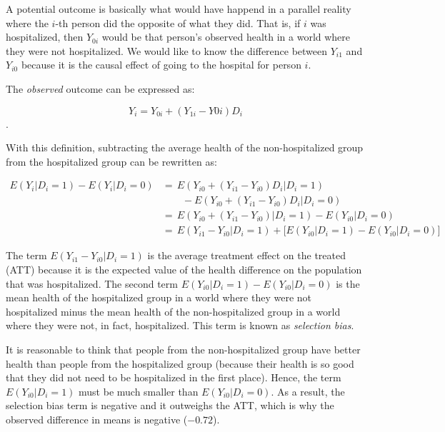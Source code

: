 \documentclass[12pt]{article}
\begin{document}
\noindent A potential outcome is basically what would have happend in a
parallel reality where the $i$-th person did the opposite of what they did.
That is, if $i$ was hospitalized, then $Y_{0i}$ would be that person's observed
health in a world where they were not hospitalized. We would like to know the
difference between $Y_{i1}$ and $Y_{i0}$ because it is the causal effect of
going to the hospital for person $i$.

The \textit{observed} outcome can be expressed as:

\begin{equation*}
    Y_i = Y_{0i} + (Y_{1i} - Y{0i}) D_i
\end{equation*}.

With this definition, subtracting the average health of the non-hospitalized
group from the hospitalized group can be rewritten as:

\begin{equation*}
    \begin{split}
        E(Y_i | D_i = 1) - E(Y_i | D_i = 0)
            & = \, E(Y_{i0} + (Y_{i1} - Y_{i0}) D_i | D_i = 1) \\
            & \qquad - E(Y_{i0} + (Y_{i1} - Y_{i0}) D_i | D_i = 0) \\
            & = \, E(Y_{i0} + (Y_{i1} - Y_{i0}) | D_i = 1)
                - E(Y_{i0} | D_i = 0) \\
            & = \, E(Y_{i1} - Y_{i0} | D_i = 1)
            + \big[ E(Y_{i0} | D_i = 1) - E(Y_{i0} | D_i = 0) \big]
    \end{split}
\end{equation*}

The term $E(Y_{i1} - Y_{i0} | D_i = 1)$ is the average treatment effect on the
treated (ATT) because it is the expected value of the health difference on the
population that was hospitalized. The second term
$E(Y_{i0} | D_i = 1) - E(Y_{i0} | D_i = 0)$ is the mean health of the
hospitalized group in a world where they were not hospitalized minus the mean
health of the non-hospitalized group in a world where they were not, in fact,
hospitalized. This term is known as \textit{selection bias}.

It is reasonable to think that people from the non-hospitalized group have
better health than people from the hospitalized group (because their health is
so good that they did not need to be hospitalized in the first place). Hence,
the term $E(Y_{i0} | D_i = 1)$ must be much smaller than $E(Y_{i0} | D_i = 0)$.
As a result, the selection bias term is negative and it outweighs the ATT,
which is why the observed difference in means is negative ($-0.72$).
\end{document}
